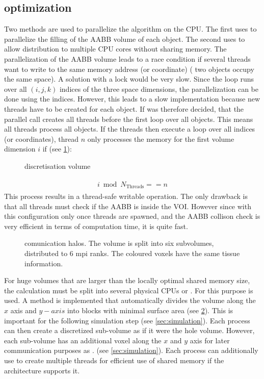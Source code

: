 \subsection{optimization}
% 
Two methods are used to parallelize the algorithm on the \ac{CPU}.
The first uses \openmp{} to parallelize the filling of the \ac{AABB} volume of each object.
The second uses \mpi{} to allow distribution to multiple \ac{CPU} cores without sharing memory. 
% 
The parallelization of the \ac{AABB} volume leads to a race condition if several threads want to write to the same memory address (or coordinate) (\eg{} two objects occupy the same space).
A solution with a lock would be very slow.
Since the loop runs over all $(i,j,k)$ indices of the three space dimensions, the parallelization can be done using the indices.
However, this leads to a slow implementation because new threads have to be created for each object.
If was therefore decided, that the parallel call creates all threads before the first loop over all objects.
This means all threads process all objects.
If the threads then execute a loop over all indices (or coordinates), thread $n$ only processes the memory for the first volume dimension $i$ if (see \cref{fig:discVolThread}):
% 
\begin{figure}[!t]
\centering
\setlength{\tikzwidth}{0.5\textwidth}
\caption{discretisation volume}
\label{fig:discVolThread}
\end{figure}
% 
\begin{align}
\begin{split}
    i \bmod N_{\text{Threads}} == n
\end{split}
\end{align}
% 
This process results in a thread-safe writable operation.
The only drawback is that all threads must check if the \ac{AABB} is inside the \ac{VOI}.
However since with this configuration only once threads are spawned, and the \ac{AABB} collison check is very efficient in terms of computation time, it is quite fast.
\\
% 
\begin{figure}[!t]
\centering
\def\tikzwidth{0.75\textwidth}
\caption{comunication halos. The volume is split into six subvolumes, distributed to 6 mpi ranks. The coloured voxels have the same tissue information.}
\label{fig:com_halo}
\end{figure}
% 
For huge volumes that are larger than the locally optimal shared memory size, the calculation must be split into several physical \acp{CPU} or .
For this purpose \mpi{} is used.
A method is implemented that automatically divides the volume along the $x$ axis and $y- axis$ into blocks with minimal surface area (see \cref{fig:com_halo}).
This is important for the following simulation step (see \cref{sec:simulation}).
Each \mpi{} process can then create a discretized sub-volume as if it were the hole volume.
However, each sub-volume has an additional voxel along the $x$ and $y$ axis for later communication purposes as . (see \cref{sec:simulation}).
Each \mpi{} process can additionally use \openmp{} to create multiple threads for efficient use of shared memory if the architecture supports it.
% 
% 
% 
